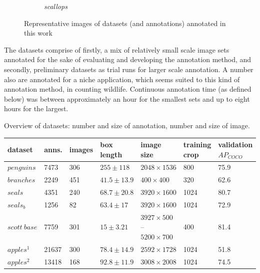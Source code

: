 \begin{figure}[h!]
\begin{subfigure}[t]{0.24\linewidth}
  \caption{\emph{scallops}}
\end{subfigure}
\caption{Representative images of datasets (and annotations) annotated in this work}
\label{fig:datasets_all}
\end{figure}

The datasets comprise of firstly, a mix of relatively small scale image sets annotated for the sake of evaluating and developing the annotation method, and secondly, preliminary datasets as trial runs for larger scale annotation. A number also are annotated for a niche application, which seems suited to this kind of annotation method, in counting wildlife. Continuous annotation time (as defined below) was between approximately an hour for the smallest sets and up to eight hours for the largest.

\begin{threeparttable}[!h]
\label{tab:resolutions}
\centering
\caption{Overview of datasets: number and size of annotation, number and size of image.  } 
\begin{tabular}{lllllll}
dataset & anns. & images & box length & image size & \shortstack{training \\ crop} & \shortstack{validation \\ $AP_{COCO}$} \\
\toprule
$penguins$        & 7473        & 306    & $255 \pm 118$   &  $2048\times1536$  & 800                                   & 75.9                   \\
$branches$        & 2249        & 451    & $41.5 \pm 13.9$ &  $400\times400$    & 320                                   & 62.6                   \\
$seals$           & 4351        & 240    & $68.7 \pm 20.8$ &  $3920\times1600$  & 1024                                    & 80.7                   \\
$seals_b$         & 1256        & 82     & $63.4 \pm 17$   & $3920\times1600$  & 1024                                                     & 72.9        \\
$scott\:base$     & 7759        & 301    & $15 \pm 3.21$     & \shortstack[l]{$3927\times500$ -- \\ $5200\times700$} & 400  & 81.4  \\
$apples^1$        & 21637       & 300    & $78.4 \pm 14.9$ &  $2592\times1728$ & 1024 & 51.8                   \\
$apples^2$        & 13418       & 168    & $92.8 \pm 11.9$ &  $3008\times2008$  & 1024                                    & 74.5                   \\

\end{tabular}
\end{threeparttable}
